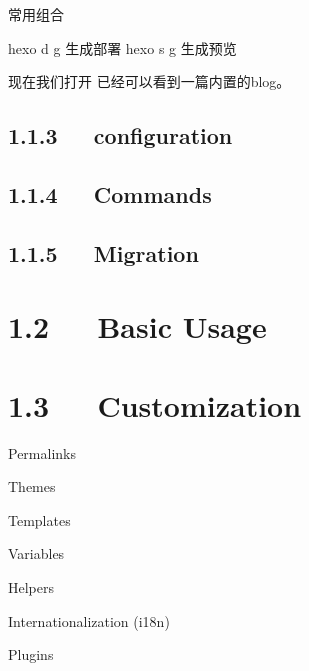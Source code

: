 \documentclass[letterpaper,12pt,english]{sphinxmanual}
\begin{document}
常用组合

\begin{sphinxVerbatim}[commandchars=\\\{\}]
\PYGZdl{} hexo d \PYGZhy{}g \PYGZsh{}生成部署
\PYGZdl{} hexo s \PYGZhy{}g \PYGZsh{}生成预览
\end{sphinxVerbatim}

现在我们打开  已经可以看到一篇内置的blog。


\subsection{1.1.3   configuration}
\label{\detokenize{001software/001install/001._u7f51_u7ad9/hexo:configuration}}


\subsection{1.1.4   Commands}
\label{\detokenize{001software/001install/001._u7f51_u7ad9/hexo:commands}}

\subsection{1.1.5   Migration}
\label{\detokenize{001software/001install/001._u7f51_u7ad9/hexo:migration}}

\section{1.2   Basic Usage}
\label{\detokenize{001software/001install/001._u7f51_u7ad9/hexo:basic-usage}}

\section{1.3   Customization}
\label{\detokenize{001software/001install/001._u7f51_u7ad9/hexo:customization}}
Permalinks

Themes


Templates

Variables

Helpers

Internationalization (i18n)

Plugins
\end{document}

